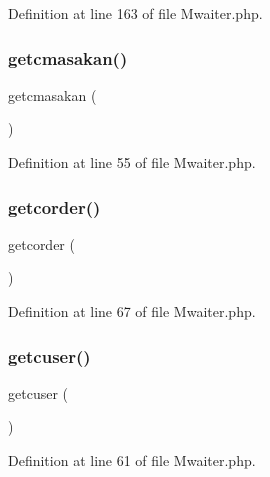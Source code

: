Definition at line 163 of file Mwaiter.\+php.

\mbox{\label{class_mwaiter_a9d032035c2608fe02d59175884d5bedf}} 
\subsubsection{\texorpdfstring{getcmasakan()}{getcmasakan()}}
{\footnotesize\ttfamily getcmasakan (\begin{DoxyParamCaption}{ }\end{DoxyParamCaption})}



Definition at line 55 of file Mwaiter.\+php.

\mbox{\label{class_mwaiter_adb847d1e2a9cd0bc6d7ed279bc06fc8d}} 
\subsubsection{\texorpdfstring{getcorder()}{getcorder()}}
{\footnotesize\ttfamily getcorder (\begin{DoxyParamCaption}{ }\end{DoxyParamCaption})}



Definition at line 67 of file Mwaiter.\+php.

\mbox{\label{class_mwaiter_a4a6926535956c4cfdc6da2ddc5cec60d}} 
\subsubsection{\texorpdfstring{getcuser()}{getcuser()}}
{\footnotesize\ttfamily getcuser (\begin{DoxyParamCaption}{ }\end{DoxyParamCaption})}



Definition at line 61 of file Mwaiter.\+php.

\mbox{\label{class_mwaiter_af6cb3909c84d55dc39b68e22ad1c7ad3}} 
